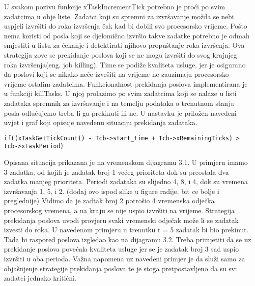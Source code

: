 \documentclass[../zavrsni.tex]{subfiles}
\begin{document}
U svakom pozivu funkcije xTaskIncrementTick potrebno je proći po svim zadatcima u obje liste. Zadatci koji su spremni za izvršavanje
možda se nebi uspjeli izvršiti do roka izvršenja čak kad bi dobili svo procesorsko vrijeme. Pošto nema koristi od posla koji se
djelomično izvršio takve zadatke potrebno je odmah smjestiti u listu za čekanje i detektirati njihovo propuštanje roka izvršenja.
Ova strategija zove se prekidanje poslova koji se ne mogu izvršiti do svog krajnjeg roka izvršenja(eng. job killing). Time se
podiže kvaliteta usluge, jer je osigurano da poslovi koji se nikako neće izvršiti na vrijeme ne zauzimaju procesorsko vrijeme 
ostalim zadatcima. Funkcionalnost prekidanja poslova implementirana je u funkciji killTasks. U njoj prolazimo po svim zadatcima koji se 
nalaze u listi zadataka spremnih za izvršavanje i na temelju podataka o trenutnom stanju posla odlučujemo treba li ga prekinuti ili ne.
U nastavku je priložen navedeni uvjet i graf koji opisuje navedenu situaciju prekidanja zadataka.
\begin{lstlisting}[style=CStyle,caption={Uvjet za prekidanje izvođenja zadatka},captionpos=b]
if((xTaskGetTickCount() - Tcb->start_time + Tcb->xRemainingTicks) > 
Tcb->xTaskPeriod)
\end{lstlisting}

Opisana situacija prikazana je na vremenskom dijagramu 3.1. U primjeru imamo 3 zadatka, od kojih je zadatak broj 1 većeg prioriteta dok su
preostala dva zadatka manjeg prioriteta. Periodi zadataka su slijedno 4, 8, i 4, dok su vremena izvršavanja 1, 5, i 2. (dodaj ovo ispod slike
u figure radije, bit ce bolje i preglednije)
Vidimo da je zadtak broj 2 potrošio 4 vremenska odječka procesorskog vremena, a na kraju se nije uspio izvršiti na vrijeme.
Strategija prekidanja poslova uvodi provjeru svaki vremenski odječak može li se zadatak izvesti do roka. U navedenom primjeru u 
trenutku t = 5 zadatak bi bio prekinut. Tada bi raspored poslova izgledao kao na dijagramu 3.2. Treba primjetiti da se uz prekidanje
poslova povećala kvaliteta usluge jer se je zadatak broj 3 sad uspio izvršiti u oba perioda. Važna napomena uz navedeni primjer je
da služi samo za objašnjenje strategije prekidanja poslova te je stoga pretpostavljeno da su svi zadatci jednako kritični.  
\end{document}
